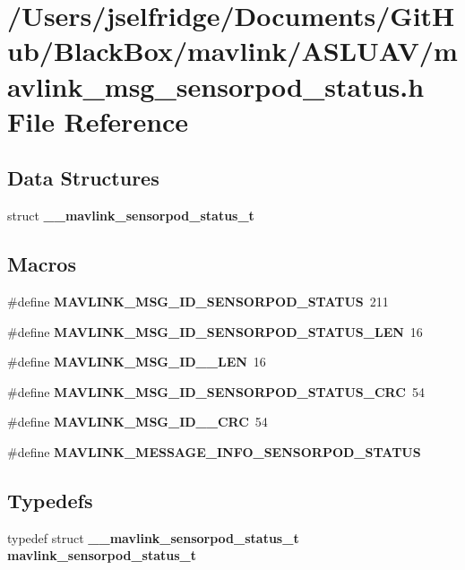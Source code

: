 \section{/\+Users/jselfridge/\+Documents/\+Git\+Hub/\+Black\+Box/mavlink/\+A\+S\+L\+U\+A\+V/mavlink\+\_\+msg\+\_\+sensorpod\+\_\+status.h File Reference}
\label{mavlink__msg__sensorpod__status_8h}
\subsection*{Data Structures}
\begin{DoxyCompactItemize}
\item 
struct \textbf{ \+\_\+\+\_\+mavlink\+\_\+sensorpod\+\_\+status\+\_\+t}
\end{DoxyCompactItemize}
\subsection*{Macros}
\begin{DoxyCompactItemize}
\item 
\#define \textbf{ M\+A\+V\+L\+I\+N\+K\+\_\+\+M\+S\+G\+\_\+\+I\+D\+\_\+\+S\+E\+N\+S\+O\+R\+P\+O\+D\+\_\+\+S\+T\+A\+T\+US}~211
\item 
\#define \textbf{ M\+A\+V\+L\+I\+N\+K\+\_\+\+M\+S\+G\+\_\+\+I\+D\+\_\+\+S\+E\+N\+S\+O\+R\+P\+O\+D\+\_\+\+S\+T\+A\+T\+U\+S\+\_\+\+L\+EN}~16
\item 
\#define \textbf{ M\+A\+V\+L\+I\+N\+K\+\_\+\+M\+S\+G\+\_\+\+I\+D\+\_\+\_\+\+L\+EN}~16
\item 
\#define \textbf{ M\+A\+V\+L\+I\+N\+K\+\_\+\+M\+S\+G\+\_\+\+I\+D\+\_\+\+S\+E\+N\+S\+O\+R\+P\+O\+D\+\_\+\+S\+T\+A\+T\+U\+S\+\_\+\+C\+RC}~54
\item 
\#define \textbf{ M\+A\+V\+L\+I\+N\+K\+\_\+\+M\+S\+G\+\_\+\+I\+D\+\_\+\_\+\+C\+RC}~54
\item 
\#define \textbf{ M\+A\+V\+L\+I\+N\+K\+\_\+\+M\+E\+S\+S\+A\+G\+E\+\_\+\+I\+N\+F\+O\+\_\+\+S\+E\+N\+S\+O\+R\+P\+O\+D\+\_\+\+S\+T\+A\+T\+US}
\end{DoxyCompactItemize}
\subsection*{Typedefs}
\begin{DoxyCompactItemize}
\item 
typedef struct \textbf{ \+\_\+\+\_\+mavlink\+\_\+sensorpod\+\_\+status\+\_\+t} \textbf{ mavlink\+\_\+sensorpod\+\_\+status\+\_\+t}
\end{DoxyCompactItemize}


